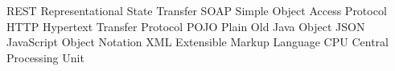 	{REST}	{Representational State Transfer}
	{SOAP}	{Simple Object Access Protocol}
	{HTTP}	{Hypertext Transfer Protocol}
	{POJO}	{Plain Old Java Object}
	{JSON}	{JavaScript Object Notation}
	{XML}	{Extensible Markup Language}
	{CPU}	{Central Processing Unit}